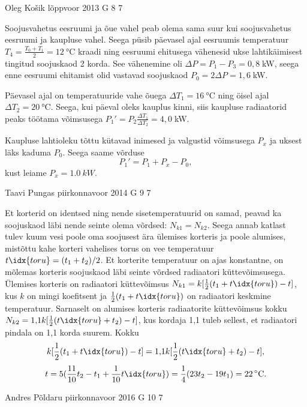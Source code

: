 \documentclass[11pt, twoside]{article}
\begin{document}
{%
{Oleg Košik} %
{lõppvoor} %
{2013} %
{G 8} %
{7} %
{

\ifSolution
Soojusvahetus eesruumi ja õue vahel peab olema sama suur kui soojusvahetus eesruumi ja kaupluse vahel. Seega püsib päevasel ajal eesruumis  temperatuur $T_4=\frac{T_0+T_1}{2}=\SI{12}{\celsius}$ kraadi ning eesruumi ehitusega vähenesid ukse lahtikäimisest tingitud soojuskaod 2 korda. See vähenemine oli $\Delta P=P_1-P_3=0,8\;$kW, seega enne eesruumi ehitamist olid vastavad soojuskaod $P_0=2\Delta P=1,6\;$kW.

Päevasel ajal on temperatuuride vahe õuega $\Delta T_1=\SI{16}{\celsius}$ ning öisel ajal $\Delta T_2=\SI{20}{\celsius}$. Seega, kui päeval oleks kauplus kinni, siis kaupluse radiaatorid peaks töötama võimsusega $P_1'=P_2\frac{\Delta T_1}{\Delta T_2}=4,0\;$kW.

Kaupluse lahtioleku tõttu kütavad inimesed ja valgustid võimsusega $P_x$ ja uksest läks kaduma $P_0$. Seega saame võrduse
\[
P_1'=P_1+P_x-P_0,
\]
kust leiame $P_x=\SI{1,0}{kW}$.
\fi
}

{Taavi Pungas} %
{piirkonnavoor} %
{2014} %
{G 9} %
{7} %
{

\ifSolution
Et korterid on identsed ning nende sisetemperatuurid on samad, peavad ka soojuskaod läbi nende seinte olema võrdsed: $N_{k1}=N_{k2}$. Seega annab katlast tulev kuum vesi poole oma soojusest ära ülemises korteris ja poole alumises, mistõttu kahe korteri vahelises torus on vee temperatuur $t\idx{toru}=(t_1+t_2)/2$. Et korterite temperatuur on ajas konstantne, on mõlemas korteris soojuskaod läbi seinte võrdsed radiaatori küttevõimsusega. Ülemises korteris on radiaatori küttevõimsus $N_{k1}=k[\frac{1}{2}(t_1+t\idx{toru})-t]$, kus $k$ on mingi koefitsent ja $\frac{1}{2}(t_1+t\idx{toru})$ on radiaatori keskmine temperatuur. Sarnaselt on alumises korteris radiaatorite küttevõimsus kokku $N_{k2}=\text{1,1} k[\frac{1}{2}(t\idx{toru}+t_{2})-t]$, kus kordaja 1,1 tuleb sellest, et radiaatori pindala on 1,1 korda suurem. Kokku
\[ k[\frac{1}{2}(t_1+t\idx{toru})-t]=\text{1,1}k[\frac{1}{2}(t\idx{toru}+t_{2})-t], \]
\[ t=5 (\frac{11}{10}t_2-t_1+\frac{1}{10}t\idx{toru})=\frac{1}{4}(23t_2-19t_1)=22\,^{\circ}\mathrm{C}. \]
\fi
}

{Andres Põldaru} %
{piirkonnavoor} %
{2016} %
{G 10} %
{7} %
{

}}
\end{document}
